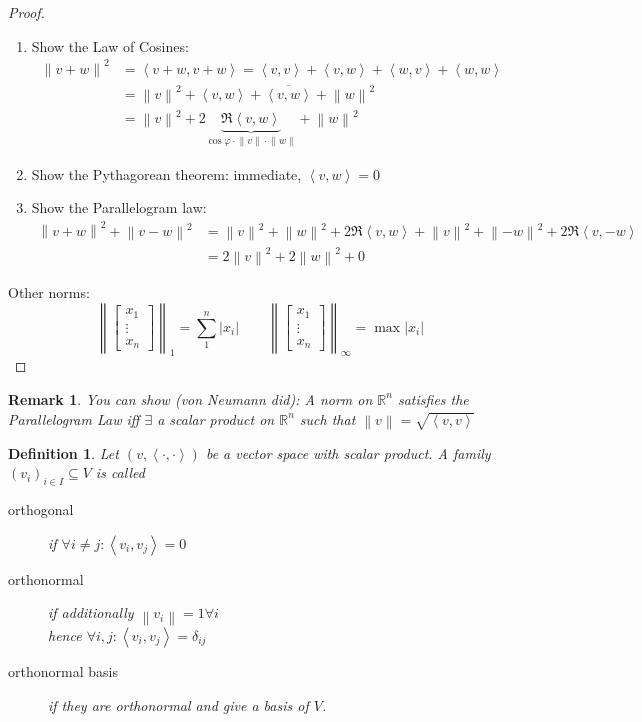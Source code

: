 \documentclass[a4paper]{article}
\newcounter{lecref}[section]
\numberwithin{lecref}{section}
\newtheorem{definition}[lecref]{Definition}
\newtheorem{remark}[lecref]{Remark}
\newcommand{\ip}[2]{\left\langle#1,#2\right\rangle} %
\newcommand{\norm}[1]{\left\|#1\right\|}
\newcommand{\card}[1]{\left|#1\right|}
\begin{document}
\begin{proof}
  \begin{enumerate}
    \item Show the Law of Cosines:
      \begin{align*}
        \norm{v + w}^2 &= \ip{v + w}{v + w} = \ip vv + \ip vw + \ip wv + \ip ww \\
          &= \norm{v}^2 + \ip vw + \overline{\ip vw} + \norm{w}^2 \\
          &= \norm{v}^2 + 2 \underbrace{\Re\ip vw}_{\cos\varphi \cdot \norm v \cdot \norm w} + \norm{w}^2
      \end{align*}
    \item Show the Pythagorean theorem: immediate, $\ip vw = 0$
    \item Show the Parallelogram law:
      \begin{align*}
        \norm{v + w}^2 + \norm{v - w}^2 &= {\norm v}^2 + \norm{w}^2 + 2 \Re\ip vw + \norm{v}^2 + \norm{-w}^2 + 2\Re\ip v{-w} \\
          &= 2 \norm{v}^2 + 2 \norm{w}^2 + 0
      \end{align*}
  \end{enumerate}
  Other norms:
  \[ \norm{\begin{bmatrix} x_1 \\ \vdots \\ x_n \end{bmatrix}}_1 = \sum_{1}^n \card{x_i} \qquad
     \norm{\begin{bmatrix} x_1 \\ \vdots \\ x_n \end{bmatrix}}_\infty = \max \card{x_i} \]
\end{proof}

\begin{remark} %
  You can show (von Neumann did):
  A norm on $\mathbb R^n$ satisfies the Parallelogram Law
  iff $\exists$ a scalar product on $\mathbb R^n$ such that $\norm v = \sqrt{\ip vv}$
\end{remark}

\begin{definition} %
  Let $(v, \ip{\cdot}{\cdot})$ be a vector space with scalar product.
  A family $(v_i)_{i \in I} \subseteq V$ is called
  \begin{description}
    \item[orthogonal] if $\forall i \neq j: \ip{v_i}{v_j} = 0$
    \item[orthonormal] if additionally $\norm{v_i} = 1 \forall i$ \\
      hence $\forall i,j: \ip{v_i}{v_j} = \delta_{ij}$
    \item[orthonormal basis] if they are orthonormal and give a basis of $V$.
  \end{description}
\end{definition}
\end{document}
